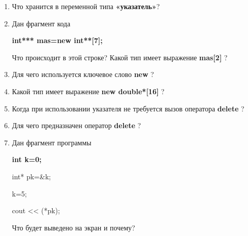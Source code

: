 \begin{enumerate}

	\item Что хранится в переменной типа {\bf  «указатель»}?

	\item Дан фрагмент кода

	{\bf int*** mas=new int**[7];}

	Что происходит в этой строке?
	Какой тип имеет выражение  {\bf mas[2] }?

	\item Для чего используется ключевое слово  {\bf new }?

	\item Какой тип имеет выражение  {\bf new double*[16] }?

	\item  Когда при использовании указателя не требуется вызов оператора {\bf delete} ?

	\item  Для чего предназначен оператор  {\bf delete} ?

	\item Дан фрагмент программы

		    {\bf
		       int k=0;

		       int* pk=\&k;

		       k=5;

		       cout <\!< (*pk);
				}

	Что будет выведено на экран и почему?

\end{enumerate}


